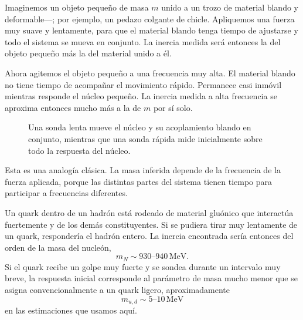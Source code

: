 Imaginemos un objeto pequeño de masa \(m\) unido a un trozo de material blando y deformable---; por ejemplo, un pedazo colgante de chicle. Apliquemos una fuerza muy suave y lentamente, para que el material blando tenga tiempo de ajustarse y todo el sistema se mueva en conjunto. La inercia medida será entonces la del objeto pequeño más la del material unido a él.

Ahora agitemos el objeto pequeño a una frecuencia muy alta. El material blando no tiene tiempo de acompañar el movimiento rápido. Permanece casi inmóvil mientras responde el núcleo pequeño. La inercia medida a alta frecuencia se aproxima entonces mucho más a la de \(m\) por sí solo.

\begin{figure}[h]
\centering
{}
\caption{Una sonda lenta mueve el núcleo y su acoplamiento blando en conjunto, mientras que una sonda rápida mide inicialmente sobre todo la respuesta del núcleo.}
\end{figure}

Esta es una analogía clásica. La masa inferida depende de la frecuencia de la fuerza aplicada, porque las distintas partes del sistema tienen tiempo para participar a frecuencias diferentes.

Un quark dentro de un hadrón está rodeado de material gluónico que interactúa fuertemente y de los demás constituyentes. Si se pudiera tirar muy lentamente de un quark, respondería el hadrón entero. La inercia encontrada sería entonces del orden de la masa del nucleón,
\begin{equation}
m_N\sim930\text{--}940\,\mathrm{MeV}.
\end{equation}
Si el quark recibe un golpe muy fuerte y se sondea durante un intervalo muy breve, la respuesta inicial corresponde al parámetro de masa mucho menor que se asigna convencionalmente a un quark ligero, aproximadamente
\begin{equation}
m_{u,d}\sim5\text{--}10\,\mathrm{MeV}
\end{equation}
en las estimaciones que usamos aquí.

